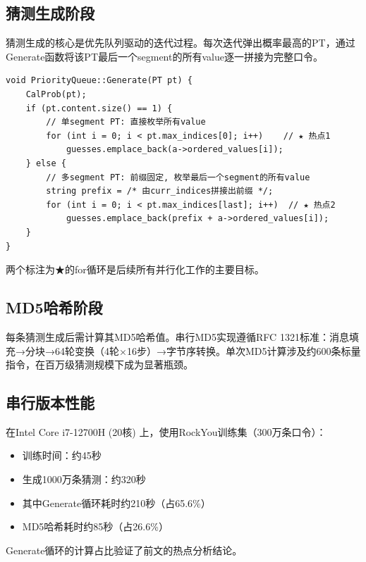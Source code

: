 \documentclass[12pt,a4paper]{ctexart}
\begin{document}
\subsection{猜测生成阶段}

猜测生成的核心是优先队列驱动的迭代过程。每次迭代弹出概率最高的PT，通过Generate函数将该PT最后一个segment的所有value逐一拼接为完整口令。

\begin{lstlisting}[caption={Generate — 串行版本（★ 标注处为并行化热点）},label=lst:generate]
void PriorityQueue::Generate(PT pt) {
    CalProb(pt);
    if (pt.content.size() == 1) {
        // 单segment PT: 直接枚举所有value
        for (int i = 0; i < pt.max_indices[0]; i++)    // ★ 热点1
            guesses.emplace_back(a->ordered_values[i]);
    } else {
        // 多segment PT: 前缀固定, 枚举最后一个segment的所有value
        string prefix = /* 由curr_indices拼接出前缀 */;
        for (int i = 0; i < pt.max_indices[last]; i++)  // ★ 热点2
            guesses.emplace_back(prefix + a->ordered_values[i]);
    }
}
\end{lstlisting}

两个标注为★的for循环是后续所有并行化工作的主要目标。

\subsection{MD5哈希阶段}

每条猜测生成后需计算其MD5哈希值。串行MD5实现遵循RFC 1321标准：消息填充→分块→64轮变换（4轮×16步）→字节序转换。单次MD5计算涉及约600条标量指令，在百万级猜测规模下成为显著瓶颈。

\subsection{串行版本性能}

在Intel Core i7-12700H (20核) 上，使用RockYou训练集（300万条口令）：
\begin{itemize}[nosep]
    \item 训练时间：约45秒
    \item 生成1000万条猜测：约320秒
    \item 其中Generate循环耗时约210秒（占65.6\%）
    \item MD5哈希耗时约85秒（占26.6\%）
\end{itemize}

Generate循环的计算占比验证了前文的热点分析结论。

\end{document}
